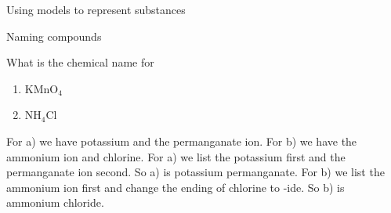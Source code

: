 \begin{activity}{Using models to represent substances}
\begin{wex}{Naming compounds}
{    What is the chemical name for \label{m38708*id734}
\begin{enumerate}[noitemsep, label=\textbf{\alph*}. ] 
            \leftskip=20pt\rightskip=\leftskip
\item $\mathrm{K}{\mathrm{MnO}}_{4}$
\item ${\mathrm{NH}}_{4}\mathrm{Cl}$\end{enumerate}
  \par 
\vspace{5pt}}
{\label{m38708*eip-824}
\label{m38708*id7432}
{
For a) we have potassium and the permanganate ion. For b) we have the ammonium ion and chlorine.} 
{ For a) we list the potassium first and the permanganate ion second. So a) is potassium permanganate. For b) we list the ammonium ion first and change the ending of chlorine to -ide. So b) is ammonium chloride.}}
    \end{wex}
    

\end{activity}

